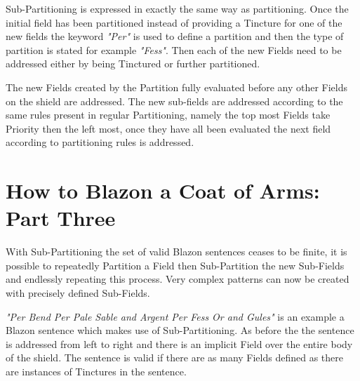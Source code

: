Sub-Partitioning is expressed in exactly the same way as partitioning. Once the initial field has been partitioned instead of providing a Tincture for one of the new fields the keyword \emph{"Per"} is used to define a partition and then the type of partition is stated for example \emph{"Fess"}.  Then each of the new Fields need to be addressed either by being Tinctured or further partitioned. 

The new Fields created by the Partition fully evaluated before any other Fields on the shield are addressed.  The new sub-fields are addressed according to the same rules present in regular Partitioning, namely the top most Fields take Priority then the left most, once they have all been evaluated the next field according to partitioning rules is addressed.

\section{How to Blazon a Coat of Arms: Part Three}

With Sub-Partitioning the set of valid Blazon sentences ceases to be finite, it is possible to repeatedly Partition a Field then Sub-Partition the new Sub-Fields and endlessly repeating this process.  Very complex patterns can now be created with precisely defined Sub-Fields.

\emph{"Per Bend Per Pale Sable and Argent Per Fess Or and Gules"} is an example a Blazon sentence which makes use of Sub-Partitioning.  As before the the sentence is addressed from left to right and there is an implicit Field over the entire body of the shield.  The sentence is valid if there are as many Fields defined as there are instances of Tinctures in the sentence. 


